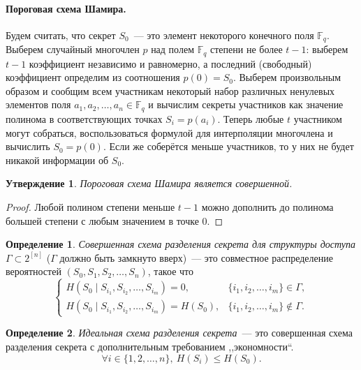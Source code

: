 \documentclass[12pt]{article}
\newcommand{\seqn}[2]{{#1}_1,{#1}_2,\dotsc,{#1}_{#2}}
\newcommand{\seqin}[3]{{#1}_{{#2}_1},{#1}_{{#2}_2},\dotsc,{#1}_{{#2}_{#3}}}
\theoremstyle{definition}
\newtheorem{definition}{Определение}[section]
\theoremstyle{plain}
\newtheorem{statement}{Утверждение}[section]
\theoremstyle{remark}
\begin{document}
\paragraph{Пороговая схема Шамира.} Будем считать, что секрет $S_0$~--- это элемент некоторого конечного
поля $\mathbb{F}_q$. Выберем случайный многочлен $p$ над полем $\mathbb{F}_q$ степени не более
$t-1$: выберем $t-1$ коэффициент независимо и равномерно, а последний (свободный) коэффициент определим из
соотношения $p(0) = S_0$. Выберем произвольным образом и сообщим всем участникам некоторый
набор различных ненулевых элементов поля $\seqn{a}{n}\in\mathbb{F}_q$ и вычислим секреты участников
как значение полинома в соответствующих точках $S_i = p(a_i)$. Теперь любые $t$ участником могут
собраться, воспользоваться формулой для интерполяции многочлена и вычислить $S_0=p(0)$. Если же
соберётся меньше участников, то у них не будет никакой информации об $S_0$.
\begin{statement}
    Пороговая схема Шамира является совершенной.
\end{statement}
\begin{proof}
    Любой полином степени меньше $t-1$ можно дополнить до полинома большей степени с любым значением в точке $0$.
\end{proof}

\begin{definition}
    \emph{Совершенная схема разделения секрета для структуры доступа $\Gamma\subset
    2^{[n]}$} ($\Gamma$ должно быть замкнуто вверх)~--- это совместное распределение вероятностей
    $(S_0,\seqn{S}{n})$, такое что
    \[
    \begin{cases}
        H(S_0\mid\seqin{S}{i}{m}) = 0,      & \{\seqn{i}{m}\}\in\Gamma,\\
        H(S_0\mid\seqin{S}{i}{m}) = H(S_0), & \{\seqn{i}{m}\}\not\in\Gamma.
    \end{cases}
    \]
\end{definition}
\begin{definition}
    \emph{Идеальная схема разделения секрета}~--- это
    совершенная схема разделения секрета с дополнительным требованием ,,экономности``.
    \[
    \forall i\in\{1,2,\dotsc,n\},\ H(S_i)\le H(S_0).
    \]
\end{definition}
\end{document}
